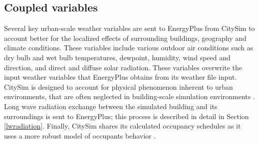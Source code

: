 \documentclass{tBPS2e}
\theoremstyle{plain}
\theoremstyle{definition}
\theoremstyle{remark}
\newcommand{\noteDT}[1]{\footnote{\textcolor{green}{#1}}}
\begin{document}


\subsection{Coupled variables}

Several key urban-scale weather variables are sent to EnergyPlus from CitySim
to account better for the localized effects of surrounding buildings,
geography and climate conditions. These variables include various outdoor air
conditions such as dry bulb and wet bulb temperatures, dewpoint, humidity, wind
speed and direction, and direct and diffuse solar radiation. These variables
overwrite the input weather variables that EnergyPlus obtains from its weather
file input. CitySim is designed to account for physical phenomenon inherent to
urban environments, that are often neglected in building-scale simulation
environments \citep{Robinson:2004cr,Robinson:2009tm}. Long wave radiation
exchange between the simulated building and its surroundings is sent to
EnergyPlus; this process is described in detail in Section \ref{lwradiation}.
Finally, CitySim shares its calculated occupancy schedules as it uses a more
robust model of occupants behavior
\citep{Haldi:2011dr}.

\end{document}
